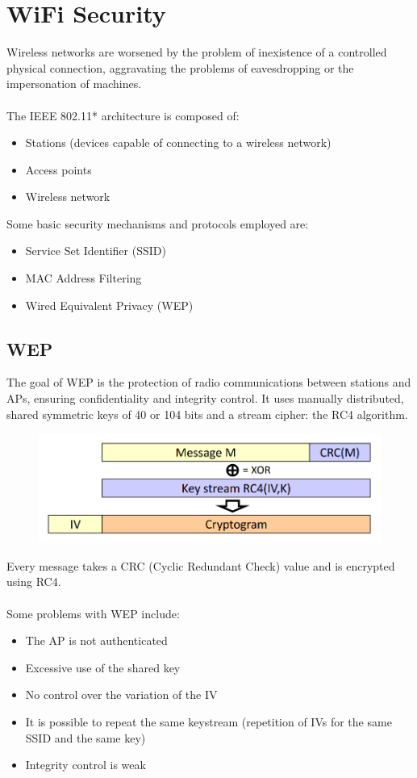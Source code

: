 \documentclass[10pt,a4paper]{report}
\begin{document}
\section{WiFi Security}
Wireless networks are worsened by the problem of inexistence of a controlled physical connection, aggravating the problems of eavesdropping or the impersonation of machines.\\
\\
The IEEE 802.11* architecture is composed of:
\begin{itemize}
\item Stations (devices capable of connecting to a wireless network)
\item Access points
\item Wireless network
\end{itemize}
Some basic security mechanisms and protocols employed are:
\begin{itemize}
\item Service Set Identifier (SSID)
\item MAC Address Filtering
\item Wired Equivalent Privacy (WEP)
\end{itemize}
\subsection{WEP}
The goal of WEP is the protection of radio communications between stations and APs, ensuring confidentiality and integrity control. It uses manually distributed, shared symmetric keys of 40 or 104 bits and a stream cipher: the RC4 algorithm.
\begin{figure}[H]
\centering
\includegraphics[scale=0.4]{34.png}
\end{figure}
Every message takes a CRC (Cyclic Redundant Check) value and is encrypted using RC4.\\
\\
Some problems with WEP include:
\begin{itemize}
\item The AP is not authenticated
\item Excessive use of the shared key
\item No control over the variation of the IV
\item It is possible to repeat the same keystream (repetition of IVs for the same SSID and the same key)
\item Integrity control is weak
\end{itemize}
\end{document}
